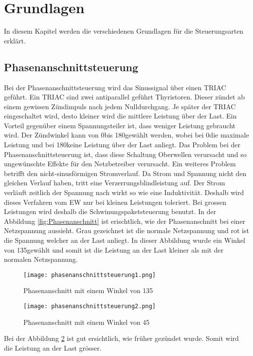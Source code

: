

\section{Grundlagen}
In diesem Kapitel werden die verschiedenen Grundlagen für die Steuerungsarten erklärt.
\subsection{Phasenanschnittsteuerung}
Bei der Phasenanschnittsteuerung wird das Sinussignal über einen TRIAC geführt. Ein TRIAC sind zwei antiparallel geführt Thyristoren. Dieser zündet ab einem gewissen Zündimpuls nach jedem Nulldurchgang. Je später der TRIAC eingeschaltet wird, desto kleiner wird die mittlere Leistung über der Last. Ein Vorteil gegenüber einem Spannungsteiler ist, dass weniger Leistung gebraucht wird. Der Zündwinkel kann von 0\textdegree bis 180\textdegree gewählt werden, wobei bei 0\textdegree die maximale Leistung und bei 180\textdegree keine Leistung über der Last anliegt. Das Problem bei der Phasenanschnittsteuerung ist, dass diese Schaltung Oberwellen verursacht und so ungewünschte Effekte für den Netzbetreiber verursacht. Ein weiteres Problem betrifft den nicht-sinusförmigen Stromverlauf. Da Strom und Spannung nicht den gleichen Verlauf haben, tritt eine Verzerrungsblindleistung auf.  Der Strom verläuft zeitlich der Spannung nach wirkt so wie eine Induktivität. Deshalb wird dieses Verfahren vom EW nur bei kleinen Leistungen toleriert. Bei grossen Leistungen wird deshalb die Schwinungspaketsteuerung benutzt. In der Abbildung \ref{fig:Phasenanschnitt} ist erischtlich, wie der Phasenanschnitt bei einer Netzspannung aussieht. Grau gezeichnet ist die normale Netzspannung und rot ist die Spannung welcher an der Last anliegt. In dieser Abbildung wurde ein Winkel von 135\textdegree gewählt und somit ist die Leistung an der Last kleiner als mit der normalen Netzspannung. 

\begin{figure}[ht!]
	\centering
	\texttt{[image: phasenanschnittsteuerung1.png]}	
	\caption{Phasenanschnitt mit einem Winkel von 135\textdegree \cite{Phasenanschnittsteuerung}}\label{fig:Phasenanschnitt1}
\end{figure}
\newpage
\begin{figure}[ht!]
	\centering
	\texttt{[image: phasenanschnittsteuerung2.png]}	
	\caption{Phasenanschnitt mit einem Winkel von 45\textdegree \cite{Phasenanschnittsteuerung}}\label{fig:Phasenanschnitt2}
\end{figure}
Bei der Abbildung \ref{fig:Phasenanschnitt2} ist gut ersichtlich, wie früher gezündet wurde. Somit wird die Leistung an der Last grösser.

